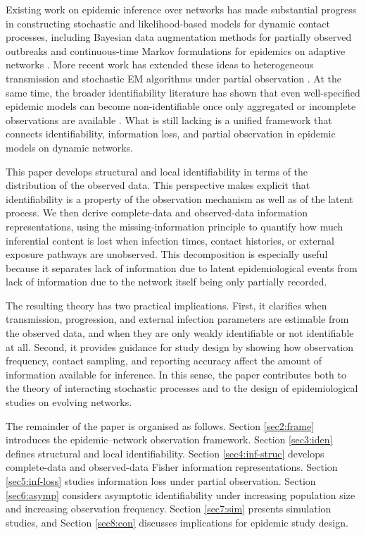 \documentclass[10pt]{article}
\begin{document}
Existing work on epidemic inference over networks has made substantial progress in constructing stochastic and likelihood-based models for dynamic contact processes, including Bayesian data augmentation methods for partially observed outbreaks and continuous-time Markov formulations for epidemics on adaptive networks  \citep{bu2022likelihood, fintzi2017efficient, huang2024detecting}. More recent work has extended these ideas to heterogeneous transmission and stochastic EM algorithms under partial observation \citep{yang2012hybrid, bu2025stochastic}. At the same time, the broader identifiability literature has shown that even well-specified epidemic models can become non-identifiable once only aggregated or incomplete observations are available \citep{browning2022efficient, saucedo2024comparative}. What is still lacking is a unified framework that connects identifiability, information loss, and partial observation in epidemic models on dynamic networks.

This paper develops structural and local identifiability in terms of the distribution of the observed data. This perspective makes explicit that identifiability is a property of the observation mechanism as well as of the latent process. We then derive complete-data and observed-data information representations, using the missing-information principle to quantify how much inferential content is lost when infection times, contact histories, or external exposure pathways are unobserved. This decomposition is especially useful because it separates lack of information due to latent epidemiological events from lack of information due to the network itself being only partially recorded.

The resulting theory has two practical implications. First, it clarifies when transmission, progression, and external infection parameters are estimable from the observed data, and when they are only weakly identifiable or not identifiable at all. Second, it provides guidance for study design by showing how observation frequency, contact sampling, and reporting accuracy affect the amount of information available for inference. In this sense, the paper contributes both to the theory of interacting stochastic processes and to the design of epidemiological studies on evolving networks.

The remainder of the paper is organised as follows. Section \ref{sec2:frame} introduces the epidemic--network observation framework. Section \ref{sec3:iden} defines structural and local identifiability. Section \ref{sec4:inf-struc} develops complete-data and observed-data Fisher information representations. Section \ref{sec5:inf-loss} studies information loss under partial observation. Section \ref{sec6:asymp} considers asymptotic identifiability under increasing population size and increasing observation frequency. Section \ref{sec7:sim} presents simulation studies, and Section \ref{sec8:con} discusses implications for epidemic study design.
\end{document}
